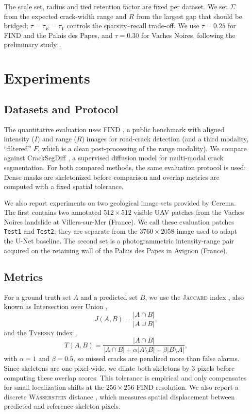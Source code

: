 \documentclass[conference,a4paper]{IEEEtran}
\newcommand{\module}[1]{\left| #1 \right|}
\begin{document}
The scale set, radius and tied retention factor are fixed per dataset. We set $\Sigma$ from the expected crack-width range and $R$ from the largest gap that should be bridged; $\tau=\tau_E=\tau_V$ controls the sparsity--recall trade-off. We use $\tau=0.25$ for FIND and the Palais des Papes, and $\tau=0.30$ for Vaches Noires, following the preliminary study \cite{BibiStrasbourg}.


\section{Experiments}

\subsection{Datasets and Protocol}
\label{sec:datasets}
The quantitative evaluation uses FIND \cite{FIND2022}, a public benchmark with aligned intensity ($I$) and range ($R$) images for road-crack detection (and a third modality, ``filtered'' $F$, which is a clean post-processing of the range modality). We compare against CrackSegDiff \cite{CrackSegDiff2024}, a supervised diffusion model for multi-modal crack segmentation. For both compared methods, the same evaluation protocol is used: Dense masks are skeletonized before comparison and overlap metrics are computed with a fixed spatial tolerance.

We also report experiments on two geological image sets provided by Cerema. The first contains two annotated $512\times512$ visible UAV patches from the Vaches Noires landslide at Villers-sur-Mer (France). We call these evaluation patches \texttt{Test1} and \texttt{Test2}; they are separate from the $3760\times2058$ image used to adapt the U-Net baseline. The second set is a photogrammetric intensity-range pair acquired on the retaining wall of the Palais des Papes in Avignon (France).

\subsection{Metrics}
\label{sec:metrics}
For a ground truth set $A$ and a predicted set $B$, we use the \textsc{Jaccard} index \cite{Jaccard1901}, also known as Intersection over Union \cite{IoUDeepLearning},
\begin{equation}
J(A,B)=\frac{\module{A\cap B}}{\module{A\cup B}},
\end{equation}
and the \textsc{Tversky} index \cite{Tversky1977},
\begin{equation}
T(A,B)=\frac{\module{A\cap B}}{\module{A\cap B}+\alpha\module{A\setminus B}+\beta\module{B\setminus A}},
\end{equation}
with $\alpha=1$ and $\beta=0.5$, so missed cracks are penalized more than false alarms. Since skeletons are one-pixel-wide, we dilate both skeletons by $3$ pixels before computing these overlap scores. This tolerance is empirical and only compensates for small localization shifts at the $256\times256$ FIND resolution. We also report a discrete \textsc{Wasserstein} distance \cite{Wasserstein, POT2017}, which measures spatial displacement between predicted and reference skeleton pixels.
\end{document}
